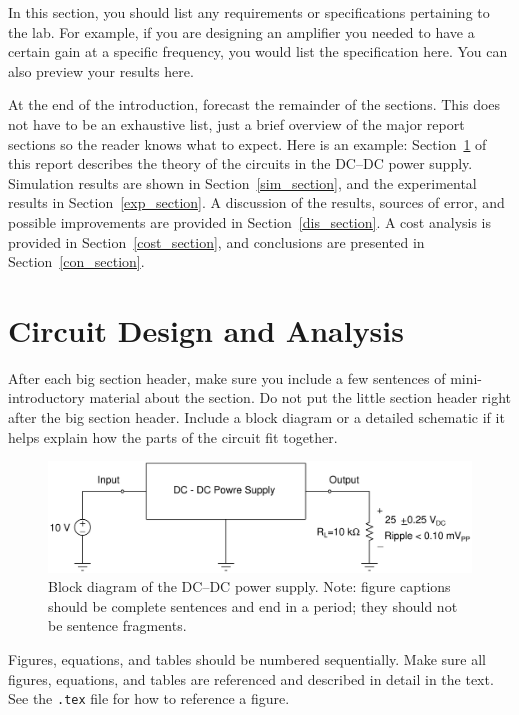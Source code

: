 \documentclass[11pt]{article}
\begin{document}
In this section, you should list any requirements or specifications pertaining to the lab. For example, if you are designing an amplifier you needed to have a certain gain at a specific frequency, you would list the specification here. You can also preview your results here. 

At the end of the introduction, forecast the remainder of the sections. This does not have to be an exhaustive list, just a brief overview of the major report sections so the reader knows what to expect. Here is an example:
Section~\ref{design_section} of this report describes the theory of the circuits in the DC--DC power supply. Simulation results are shown in Section~\ref{sim_section}, and the experimental results in Section~\ref{exp_section}. A discussion of the results, sources of error, and possible improvements are provided in Section~\ref{dis_section}. A cost analysis is provided in Section~\ref{cost_section}, and conclusions are presented in Section~\ref{con_section}.

\section{Circuit Design and Analysis}
\label{design_section}

After each big section header, make sure you include a few sentences of mini-introductory material about the section. Do not put the little section header right after the big section header. Include a block diagram or a detailed schematic if it helps explain how the parts of the circuit fit together.

\begin{figure}[ht]
\centering
\includegraphics[width=5in]{dcdc_block}
\caption{Block diagram of the DC--DC power supply. Note: figure captions should be complete sentences and end in a period; they should not be sentence fragments.}
\label{block}
\end{figure}

Figures, equations, and tables should be numbered sequentially. Make sure all figures, equations, and tables are referenced and described in detail in the text. See the {\tt .tex} file for how to reference a figure. 
\end{document}
